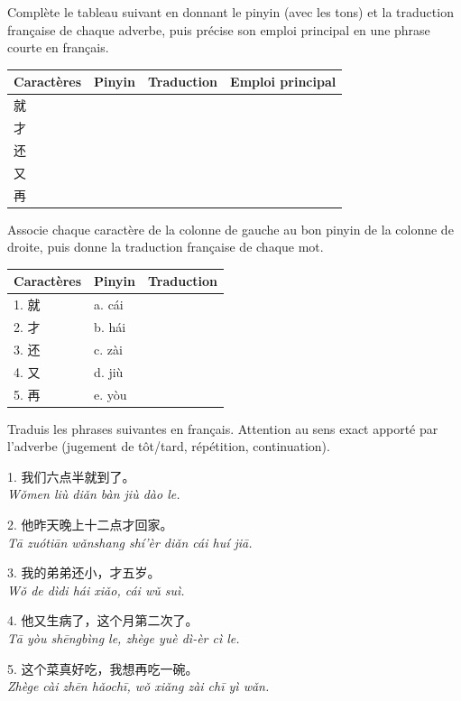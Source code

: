 \documentclass[11pt]{article}
\newcounter{popsec}
\newcounter{popsub}
\newcommand{\courssub}[1]{%
  \stepcounter{popsub}%
  \par\vspace{9pt}\noindent{\popxbold\fontsize{11.5}{13}\selectfont\color{popink}{\color{poporange}\thepopsec.\thepopsub}\hspace{6pt}#1}\par\nopagebreak\vspace{4pt}
}
\begin{document}
\begin{exercice}
Complète le tableau suivant en donnant le pinyin (avec les tons) et la traduction française de chaque adverbe, puis précise son emploi principal en une phrase courte en français.

\begin{center}
\begin{tabularx}{\linewidth}{|X|X|X|X|}
\hline
\rowcolor{popblueL} Caractères & Pinyin & Traduction & Emploi principal \\
\hline
就 & & & \\
\hline
才 & & & \\
\hline
还 & & & \\
\hline
又 & & & \\
\hline
再 & & & \\
\hline
\end{tabularx}
\end{center}
\end{exercice}

\begin{exercice}
Associe chaque caractère de la colonne de gauche au bon pinyin de la colonne de droite, puis donne la traduction française de chaque mot.

\begin{center}
\begin{tabularx}{\linewidth}{|X|X|X|}
\hline
\rowcolor{popblueL} Caractères & Pinyin & Traduction \\
\hline
1. 就 & a. cái & \\
\hline
2. 才 & b. hái & \\
\hline
3. 还 & c. zài & \\
\hline
4. 又 & d. jiù & \\
\hline
5. 再 & e. yòu & \\
\hline
\end{tabularx}
\end{center}
\end{exercice}

\courssub{Je m'entraîne}

\begin{exercice}
Traduis les phrases suivantes en français. Attention au sens exact apporté par l'adverbe (jugement de tôt/tard, répétition, continuation).

1. 我们六点半就到了。\\
\emph{Wǒmen liù diǎn bàn jiù dào le.}

2. 他昨天晚上十二点才回家。\\
\emph{Tā zuótiān wǎnshang shí'èr diǎn cái huí jiā.}

3. 我的弟弟还小，才五岁。\\
\emph{Wǒ de dìdi hái xiǎo, cái wǔ suì.}

4. 他又生病了，这个月第二次了。\\
\emph{Tā yòu shēngbìng le, zhège yuè dì-èr cì le.}

5. 这个菜真好吃，我想再吃一碗。\\
\emph{Zhège cài zhēn hǎochī, wǒ xiǎng zài chī yì wǎn.}
\end{exercice}
\end{document}
